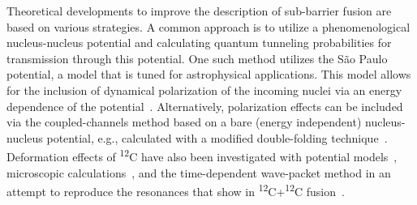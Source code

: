 

Theoretical developments to improve the description of sub-barrier fusion are based on various strategies.
A common approach is to utilize a phenomenological nucleus-nucleus potential and calculating quantum tunneling probabilities for transmission through this potential.
One such method utilizes the S\~ao Paulo potential, a model that is tuned for astrophysical applications. 
This model allows for the inclusion of dynamical polarization of the incoming nuclei via an energy dependence of the potential~\protect\citep{gasques2004,gasques2005,gasques2007}.
Alternatively, polarization effects can be included via the coupled-channels method based on a bare (energy independent) nucleus-nucleus potential, 
e.g., calculated with a modified double-folding technique~\protect\citep{esbensen2011,jiang2013}.
Deformation effects of \textsuperscript{12}C have also been investigated with potential models~\protect\citep{denisov2010c}, microscopic calculations~\protect\citep{heenen1981},
and the time-dependent wave-packet method in an attempt to reproduce the resonances that show in \textsuperscript{12}C+\textsuperscript{12}C fusion~\protect\citep{diaz-torres2018}.

